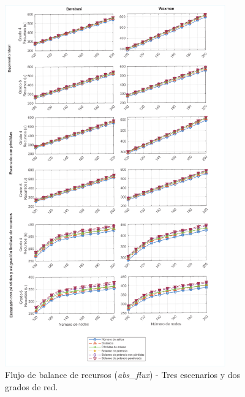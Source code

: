 \begin{figure}[H]
    \centering
    \includegraphics[width=0.85\textwidth,angle=0.9]{fig/05_den2ne/den2ne_17.pdf}
    \caption{Flujo de balance de recursos (\textit{abs\_flux}) - Tres escenarios y dos grados de red.}
    \label{fig:f1}
\end{figure}

